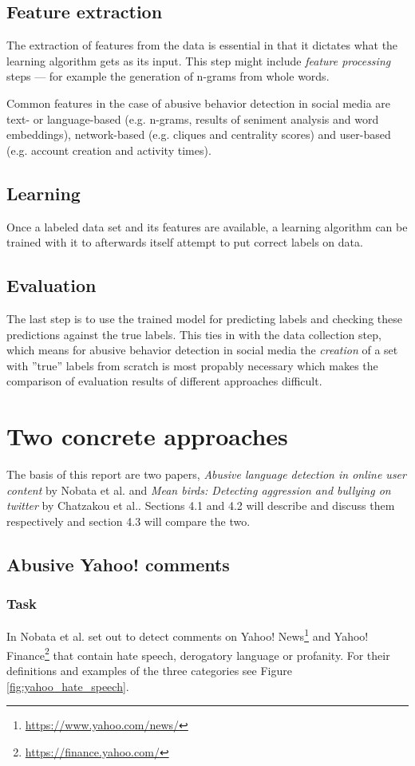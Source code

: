 \documentclass{proseminar}
\begin{document}
\subsection{Feature extraction}
The extraction of features from the data is essential in that it dictates what the learning algorithm gets as its input. This step might include \emph{feature processing} steps --- for example the generation of n-grams from whole words.

Common features in the case of abusive behavior detection in social media are text- or language-based (e.g. n-grams, results of seniment analysis and word embeddings), network-based (e.g. cliques and centrality scores) and user-based (e.g. account creation and activity times).

\subsection{Learning}
Once a labeled data set and its features are available, a learning algorithm can be trained with it to afterwards itself attempt to put correct labels on data.

\subsection{Evaluation}
The last step is to use the trained model for predicting labels and checking these predictions against the true labels. This ties in with the data collection step, which means for abusive behavior detection in social media the \emph{creation} of a set with ''true'' labels from scratch is most propably necessary which makes the comparison of evaluation results of different approaches difficult.

\section{Two concrete approaches}
The basis of this report are two papers, \emph{Abusive language detection in online user content} by Nobata et al.\cite{Yahoo:2016} and \emph{Mean birds: Detecting aggression and bullying on twitter} by Chatzakou et al.\cite{Twitter:2017}. Sections 4.1 and 4.2 will describe and discuss them respectively and section 4.3 will compare the two.

\subsection{Abusive Yahoo! comments}
\subsubsection{Task}
In \cite{Yahoo:2016} Nobata et al. set out to detect comments on Yahoo! News\footnote{\url{https://www.yahoo.com/news/}} and Yahoo! Finance\footnote{\url{https://finance.yahoo.com/}} that contain hate speech, derogatory language or profanity. For their definitions and examples of the three categories see Figure \ref{fig:yahoo_hate_speech}.
\end{document}

